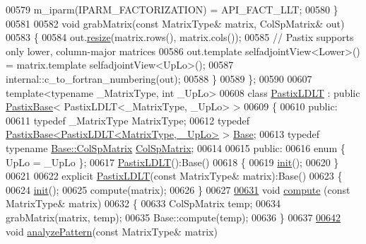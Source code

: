 \begin{DoxyCode}
00579       m\_iparm(IPARM\_FACTORIZATION) = API\_FACT\_LLT;
00580     \}
00581     
00582     \textcolor{keywordtype}{void} grabMatrix(\textcolor{keyword}{const} MatrixType& matrix, ColSpMatrix& out)
00583     \{
00584       out.\hyperlink{group___sparse_core___module_af88551f30202341b7cc24cfadabdec5c}{resize}(matrix.rows(), matrix.cols());
00585       \textcolor{comment}{// Pastix supports only lower, column-major matrices }
00586       out.template selfadjointView<Lower>() = matrix.template selfadjointView<UpLo>();
00587       internal::c\_to\_fortran\_numbering(out);
00588     \}
00589 \};
00590 
00607 \textcolor{keyword}{template}<\textcolor{keyword}{typename} \_MatrixType, \textcolor{keywordtype}{int} \_UpLo>
00608 \textcolor{keyword}{class }\hyperlink{class_eigen_1_1_pastix_l_d_l_t}{PastixLDLT} : \textcolor{keyword}{public} \hyperlink{class_eigen_1_1_pastix_base}{PastixBase}< PastixLDLT<\_MatrixType, \_UpLo> >
00609 \{
00610   \textcolor{keyword}{public}:
00611     \textcolor{keyword}{typedef} \_MatrixType MatrixType;
00612     \textcolor{keyword}{typedef} \hyperlink{class_eigen_1_1_pastix_base}{PastixBase<PastixLDLT<MatrixType, \_UpLo>} > 
      \hyperlink{class_eigen_1_1_pastix_base}{Base}; 
00613     \textcolor{keyword}{typedef} \textcolor{keyword}{typename} \hyperlink{group___sparse_core___module}{Base::ColSpMatrix} \hyperlink{group___sparse_core___module}{ColSpMatrix};
00614     
00615   \textcolor{keyword}{public}:
00616     \textcolor{keyword}{enum} \{ UpLo = \_UpLo \};
00617     \hyperlink{class_eigen_1_1_pastix_l_d_l_t}{PastixLDLT}():Base()
00618     \{
00619       \hyperlink{structinit}{init}();
00620     \}
00621     
00622     \textcolor{keyword}{explicit} \hyperlink{class_eigen_1_1_pastix_l_d_l_t}{PastixLDLT}(\textcolor{keyword}{const} MatrixType& matrix):Base()
00623     \{
00624       \hyperlink{structinit}{init}();
00625       compute(matrix);
00626     \}
00627 
\hyperlink{class_eigen_1_1_pastix_l_d_l_t_abf3135c2dc17d9df26fef80e6456a691}{00631}     \textcolor{keywordtype}{void} \hyperlink{class_eigen_1_1_pastix_l_d_l_t_abf3135c2dc17d9df26fef80e6456a691}{compute} (\textcolor{keyword}{const} MatrixType& matrix)
00632     \{
00633       ColSpMatrix temp;
00634       grabMatrix(matrix, temp);
00635       Base::compute(temp);
00636     \}
00637 
\hyperlink{class_eigen_1_1_pastix_l_d_l_t_a01947862303ca404b9ce5033751a221b}{00642}     \textcolor{keywordtype}{void} \hyperlink{class_eigen_1_1_pastix_l_d_l_t_a01947862303ca404b9ce5033751a221b}{analyzePattern}(\textcolor{keyword}{const} MatrixType& matrix)

\end{DoxyCode}
